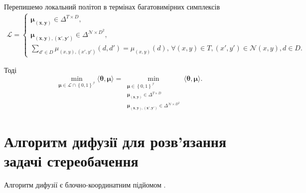 Перепишемо локальний політоп в термінах багатовимірних симплексів
\begin{equation*}
\begin{gathered}
    \mathcal{L} =
    \begin{cases}
        \pmb{\mu_{\left(x, y \right)}} \in \Delta^{T \times D}, \\
        \pmb{\mu_{ \left(x, y \right), \left(x', y' \right)}} \in
            \Delta^{\mathcal{N} \times D^2}, \\
        \sum \limits_{d' \in D}
            \mu_{\left(x, y \right), \left(x', y' \right)} \left(d, d' \right) =
            \mu_{\left(x, y \right)} \left(d \right), \,
        \forall \left(x, y \right) \in T,
        \left(x', y' \right) \in \mathcal{N} \left(x, y \right),
        d \in D.
    \end{cases}
\end{gathered}
\end{equation*}

Тоді
\begin{equation*}
    \min \limits_{\pmb{\mu} \in \mathcal{L} \cap \left\{0, 1 \right\}^{\mathcal{I}}}
        \langle \pmb{\theta}, \pmb{\mu} \rangle =
    \min \limits_{\substack{\pmb{\mu} \in \left\{ 0, 1 \right\}^{\mathcal{I}} \\
                            \pmb{\mu_{\left(x, y \right)}} \in \Delta^{T \times D} \\
                            \pmb{\mu_{\left(x, y \right), \left(x', y' \right)}} \in
                                \Delta^{\mathcal{N} \times D^2}}}
        \langle \pmb{\theta}, \pmb{\mu} \rangle.
\end{equation*}

\section{Алгоритм дифузії для розв'язання задачі стереобачення}

Алгоритм дифузії є блочно-координатним підйомом
\cite{overview:savchynskyy:diffusion}.

